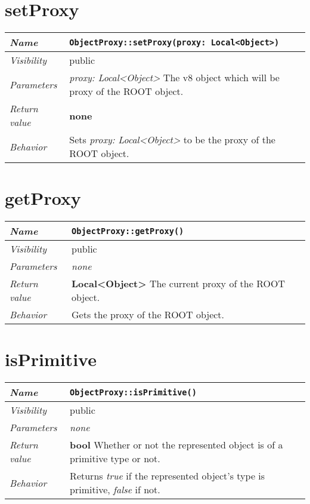  \section{setProxy}
\begin{longtable}{p{3cm} @{\hskip 1cm} p{12cm}}
 \hline
\textit{Name} & \texttt{ObjectProxy::setProxy(proxy: Local<Object>)}\\
\hline
 \textit{Visibility} & public\\
\hline
\textit{Parameters} & \textit{proxy: Local<Object>} The v8 object which will be proxy of the ROOT object. \\
\hline
\textit{Return value} & \textbf{none}\\
  \hline
 \textit{Behavior} & Sets \textit{proxy: Local<Object>} to be the proxy of the ROOT object. \\
\hline
\end{longtable} \pagebreak
 \section{getProxy}
\begin{longtable}{p{3cm} @{\hskip 1cm} p{12cm}}
 \hline
\textit{Name} & \texttt{ObjectProxy::getProxy()}\\
\hline
 \textit{Visibility} & public\\
\hline
\textit{Parameters} & \textit{none}\\
\hline
\textit{Return value} & \textbf{Local<Object>} The current proxy of the ROOT object. \\
  \hline
 \textit{Behavior} & Gets the proxy of the ROOT object. \\
\hline
\end{longtable} \pagebreak
 \section{isPrimitive}
\begin{longtable}{p{3cm} @{\hskip 1cm} p{12cm}}
 \hline
\textit{Name} & \texttt{ObjectProxy::isPrimitive()}\\
\hline
 \textit{Visibility} & public\\
\hline
\textit{Parameters} & \textit{none}\\
\hline
\textit{Return value} & \textbf{bool} Whether or not the represented object is of a primitive type or not.\\
  \hline
  \textit{Behavior} & Returns \textit{true} if the represented object's type is primitive, \textit{false} if not.\\
\hline
\end{longtable} \pagebreak
